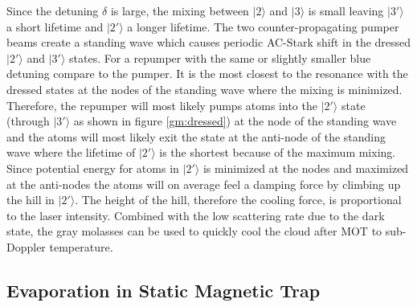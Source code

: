 Since the detuning $\delta$ is large, the mixing between $|2\rangle$ and $|3\rangle$ is small leaving $|3'\rangle$ a short lifetime and $|2'\rangle$ a longer lifetime. The two counter-propagating pumper beams create a standing wave which causes periodic AC-Stark shift in the dressed $|2'\rangle$ and $|3'\rangle$ states. For a repumper with the same or slightly smaller blue detuning compare to the pumper. It is the most closest to the resonance with the dressed states at the nodes of the standing wave where the mixing is minimized. Therefore, the repumper will most likely pumps atoms into the $|2'\rangle$ state (through $|3'\rangle$ as shown in figure \ref{gm:dressed}) at the node of the standing wave and the atoms will most likely exit the state at the anti-node of the standing wave where the lifetime of $|2'\rangle$ is the shortest because of the maximum mixing. Since potential energy for atoms in $|2'\rangle$ is minimized at the nodes and maximized at the anti-nodes the atoms will on average feel a damping force by climbing up the hill in $|2'\rangle$. The height of the hill, therefore the cooling force, is proportional to the laser intensity. Combined with the low scattering rate due to the dark state, the gray molasses can be used to quickly cool the cloud after MOT to sub-Doppler temperature.

\subsection{Evaporation in Static Magnetic Trap}\label{theory:mt}

